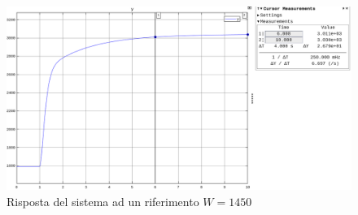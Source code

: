 \documentclass[a4paper,12pt,italian]{article}
\begin{document}
\begin{figure}[h!]
    \begin{center}
        \includegraphics[scale=0.35]{img/variazioni_W.png}
        \caption{Risposta del sistema ad un riferimento $W = 1450$}
    \end{center}
\end{figure}
\end{document}
